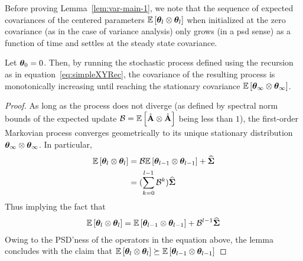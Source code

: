 Before proving Lemma~\ref{lem:var-main-1}, we note that the sequence of expected covariances of the centered parameters $\mathbb{E}\left[\boldsymbol{\theta}_l\otimes\boldsymbol{\theta}_l\right]$ when initialized at the zero covariance (as in the case of variance analysis) only grows (in a psd sense) as a function of time and settles at the steady state covariance.
\begin{lemma}
Let $\boldsymbol{\theta}_0=0$. Then, by running the stochastic process defined using the recursion as in equation~\ref{eq:simpleXYRec}, the covariance of the resulting process is monotonically increasing until reaching the stationary covariance $\mathbb{E}\left[\boldsymbol{\theta}_{\infty}\otimes\boldsymbol{\theta}_{\infty}\right]$.
\end{lemma}
\begin{proof}
As long as the process does not diverge (as defined by spectral norm bounds of the expected update $\mathcal{B}=\mathbb{E}\left[\hat{\mathbf{A}}\otimes\hat{\mathbf{A}}\right]$ being less than $1$), the first-order Markovian process converges geometrically to its unique stationary distribution $\boldsymbol{\theta}_{\infty}\otimes\boldsymbol{\theta}_{\infty}$.
In particular,
\begin{align*}
\mathbb{E}\left[\boldsymbol{\theta}_l\otimes\boldsymbol{\theta}_l\right]&=\mathcal{B}\mathbb{E}\left[\boldsymbol{\theta}_{l-1}\otimes\boldsymbol{\theta}_{l-1}\right]+\mathbf{\widehat{\Sigma}}\\
&=(\sum_{k=0}^{l-1}\mathcal{B}^k)\mathbf{\widehat{\Sigma}}
\end{align*}
Thus implying the fact that
\begin{align*}
\mathbb{E}\left[\boldsymbol{\theta}_l\otimes\boldsymbol{\theta}_l\right] = \mathbb{E}\left[\boldsymbol{\theta}_{l-1}\otimes\boldsymbol{\theta}_{l-1}\right]+\mathcal{B}^{l-1}\mathbf{\widehat{\Sigma}}
\end{align*}
Owing to the PSD'ness of the operators in the equation above, the lemma concludes with the claim that $\mathbb{E}\left[\boldsymbol{\theta}_l\otimes\boldsymbol{\theta}_l\right]\succeq\mathbb{E}\left[\boldsymbol{\theta}_{l-1}\otimes\boldsymbol{\theta}_{l-1}\right]$
\end{proof}

